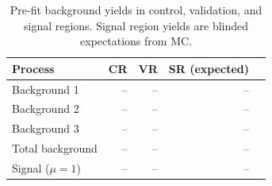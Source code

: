 \begin{table}[htbp]
  \centering
  \caption{Pre-fit background yields in control, validation, and signal regions.
           Signal region yields are blinded expectations from MC.}
  \label{tab:yields}
  \begin{tabular}{lrrrr}
    \toprule
    Process & CR & VR & SR (expected) \\
    \midrule
    Background 1  & -- & -- & -- \\
    Background 2  & -- & -- & -- \\
    Background 3  & -- & -- & -- \\
    \midrule
    Total background & -- & -- & -- \\
    \midrule
    Signal ($\mu=1$) & -- & -- & -- \\
    \bottomrule
  \end{tabular}
\end{table}
